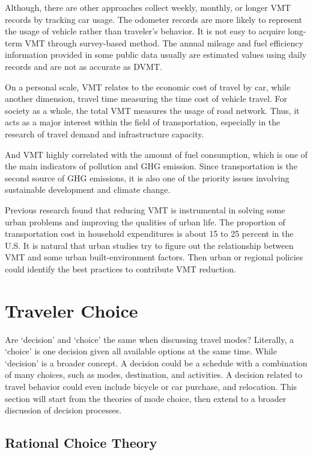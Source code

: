 \documentclass[
  11pt,
  openany]{memoir}
\begin{document}
Although, there are other approaches collect weekly, monthly, or longer VMT records by tracking car usage.
The odometer records are more likely to represent the usage of vehicle rather than traveler's behavior.
It is not easy to acquire long-term VMT through survey-based method. The annual mileage and fuel efficiency information provided in some public data usually are estimated values using daily records and are not as accurate as DVMT.

On a personal scale, VMT relates to the economic cost of travel by car, while another dimension, travel time measuring the time cost of vehicle travel.
For society as a whole, the total VMT measures the usage of road network.
Thus, it acts as a major interest within the field of transportation, especially in the research of travel demand and infrastructure capacity.

And VMT highly correlated with the amount of fuel consumption, which is one of the main indicators of pollution and GHG emission. Since transportation is the second source of GHG emissions, it is also one of the priority issues involving sustainable development and climate change.

Previous research found that reducing VMT is instrumental in solving some urban problems and improving the qualities of urban life. The proportion of transportation cost in household expenditures is about 15 to 25 percent in the U.S.
It is natural that urban studies try to figure out the relationship between VMT and some urban built-environment factors. Then urban or regional policies could identify the best practices to contribute VMT reduction.

\hypertarget{traveler-choice}{%
\section{Traveler Choice}\label{traveler-choice}}

Are `decision' and `choice' the same when discussing travel modes? Literally, a `choice' is one decision given all available options at the same time. While `decision' is a broader concept. A decision could be a schedule with a combination of many choices, such as modes, destination, and activities. A decision related to travel behavior could even include bicycle or car purchase, and relocation. This section will start from the theories of mode choice, then extend to a broader discussion of decision processes.

\hypertarget{rational-choice-theory}{%
\subsection{Rational Choice Theory}\label{rational-choice-theory}}
\end{document}

